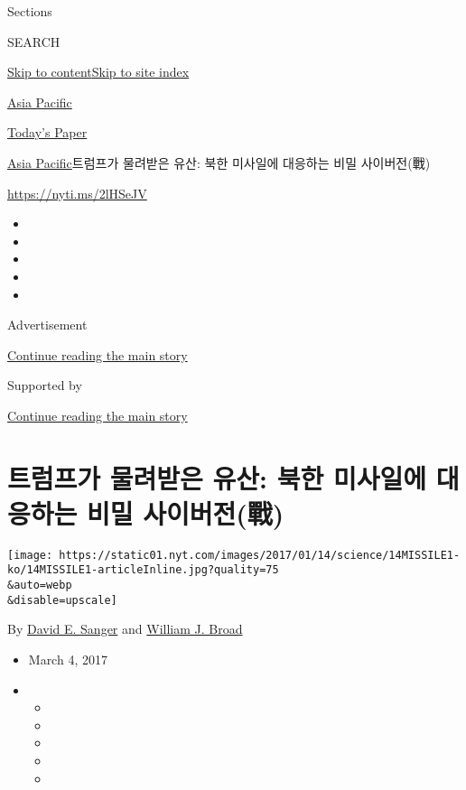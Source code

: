 Sections

SEARCH

\protect\hyperlink{site-content}{Skip to
content}\protect\hyperlink{site-index}{Skip to site index}

\href{https://www.nytimes.com/section/world/asia}{Asia Pacific}

\href{https://myaccount.nytimes.com/auth/login?response_type=cookie\&client_id=vi}{}

\href{https://www.nytimes.com/section/todayspaper}{Today's Paper}

\href{/section/world/asia}{Asia Pacific}\textbar{}트럼프가 물려받은
유산: 북한 미사일에 대응하는 비밀 사이버전(戰)

\url{https://nyti.ms/2lHSeJV}

\begin{itemize}
\item
\item
\item
\item
\item
\end{itemize}

Advertisement

\protect\hyperlink{after-top}{Continue reading the main story}

Supported by

\protect\hyperlink{after-sponsor}{Continue reading the main story}

\hypertarget{uxd2b8uxb7fcuxd504uxac00-uxbb3cuxb824uxbc1buxc740-uxc720uxc0b0-uxbd81uxd55c-uxbbf8uxc0acuxc77cuxc5d0-uxb300uxc751uxd558uxb294-uxbe44uxbc00-uxc0acuxc774uxbc84uxc804ux6230}{%
\section{트럼프가 물려받은 유산: 북한 미사일에 대응하는 비밀
사이버전(戰)}\label{uxd2b8uxb7fcuxd504uxac00-uxbb3cuxb824uxbc1buxc740-uxc720uxc0b0-uxbd81uxd55c-uxbbf8uxc0acuxc77cuxc5d0-uxb300uxc751uxd558uxb294-uxbe44uxbc00-uxc0acuxc774uxbc84uxc804ux6230}}

\texttt{[image: https://static01.nyt.com/images/2017/01/14/science/14MISSILE1-ko/14MISSILE1-articleInline.jpg?quality=75\\\&auto=webp\\\&disable=upscale]}

By \href{http://www.nytimes.com/by/david-e-sanger}{David E. Sanger} and
\href{http://www.nytimes.com/by/william-j-broad}{William J. Broad}

\begin{itemize}
\item
  March 4, 2017
\item
  \begin{itemize}
  \item
  \item
  \item
  \item
  \item
  \end{itemize}
\end{itemize}

